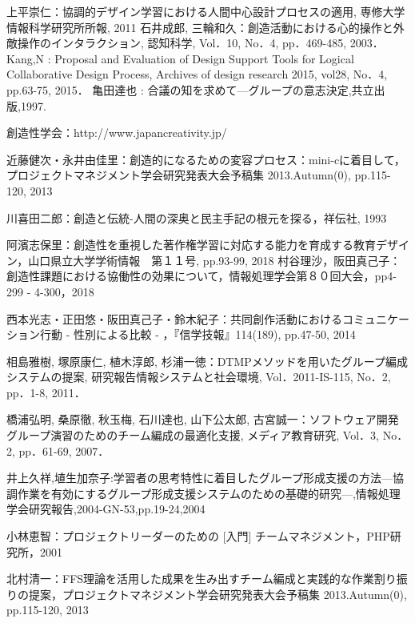\documentclass{funthesis}
\begin{document}
\begin{thebibliography}{9}
  上平崇仁：協調的デザイン学習における人間中心設計プロセスの適用, 専修大学情報科学研究所所報, 2011
石井成郎, 三輪和久：創造活動における心的操作と外敵操作のインタラクション, 認知科学, Vol．10, No．4, pp．469-485, 2003．
Kang,N : Proposal and Evaluation of Design
Support Tools for Logical Collaborative Design Process, Archives of design research 2015, vol28, No．4, pp.63-75, 2015．
亀田達也 : 合議の知を求めて—グループの意志決定,共立出版,1997.

創造性学会：http://www.japancreativity.jp/

近藤健次・永井由佳里：創造的になるための変容プロセス：mini-cに着目して，プロジェクトマネジメント学会研究発表大会予稿集 2013.Autumn(0), pp.115-120, 2013

川喜田二郎：創造と伝統-人間の深奥と民主手記の根元を探る，祥伝社, 1993

阿濱志保里：創造性を重視した著作権学習に対応する能力を育成する教育デザイン，山口県立大学学術情報　第１１号, pp.93-99, 2018
村谷理沙，阪田真己子：創造性課題における協働性の効果について，情報処理学会第８０回大会，pp4-299 - 4-300，2018

西本光志・正田悠・阪田真己子・鈴木紀子：共同創作活動におけるコミュニケーション行動 - 性別による比較 - ，『信学技報』114(189), pp.47-50, 2014

相島雅樹, 塚原康仁, 植木淳郎, 杉浦一徳：DTMPメソッドを用いたグループ編成システムの提案, 研究報告情報システムと社会環境, Vol．2011-IS-115, No．2, pp．1-8, 2011．

橋浦弘明, 桑原徹, 秋玉梅, 石川達也, 山下公太郎, 古宮誠一：ソフトウェア開発グループ演習のためのチーム編成の最適化支援, メディア教育研究, Vol．3, No．2, pp．61-69, 2007． 

井上久祥,埴生加奈子:学習者の思考特性に着目したグループ形成支援の方法—協調作業を有効にするグループ形成支援システムのための基礎的研究—,情報処理学会研究報告,2004-GN-53,pp.19-24,2004

小林恵智：プロジェクトリーダーのための [入門] チームマネジメント，PHP研究所，2001

北村清一：FFS理論を活用した成果を生み出すチーム編成と実践的な作業割り振りの提案，プロジェクトマネジメント学会研究発表大会予稿集 2013.Autumn(0), pp.115-120, 2013


\end{thebibliography}
\end{document}
